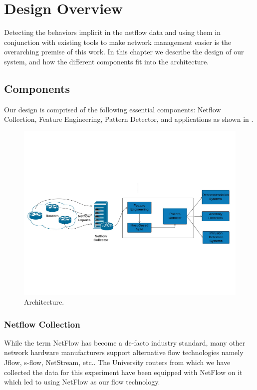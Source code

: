 
\chapter{Design Overview}

Detecting the behaviors implicit in the netflow data and
using them in conjunction with existing tools to make network management easier is the overarching premise of this work. In this chapter we describe the design of our system, and how the
different components fit into the architecture.

\section{Components}
Our design is comprised of the following essential components: Netflow Collection, Feature Engineering, Pattern Detector, and
applications as shown in .
\begin{figure}[t]
	\centerline{\includegraphics[trim=4cm 4cm 4cm 4cm, scale = 0.6]{architecture.pdf}}
	\caption{Architecture.}%
\end{figure}

\subsection{Netflow Collection}
While the term NetFlow has become a de-facto industry standard, many other network hardware manufacturers support alternative flow technologies namely Jflow, s-flow, NetStream, etc.. The University routers from which we have collected the data for this experiment have been equipped with NetFlow on it which led to using NetFlow as our flow technology. 
